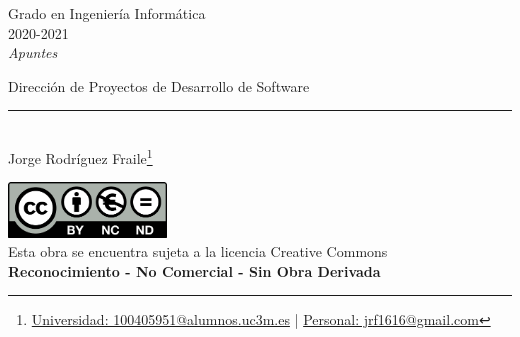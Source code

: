 \documentclass[12pt, twoside, openright]{report} %
\begin{document}
	
\begin{titlepage}
	\begin{sffamily}
	\color{azulUC3M}
	\begin{center}
		\begin{figure}[H] %
		\end{figure}
		\vspace{2.5cm}
		\begin{Large}
			Grado en Ingeniería Informática\\			
			2020-2021\\
			\vspace{2cm}		
			\textsl{Apuntes}\\
			\bigskip
		\end{Large}
		 	{\Huge Dirección de Proyectos de Desarrollo de Software}\\
		 	\vspace*{0.5cm}
	 		\rule{10.5cm}{0.1mm}\\
			\vspace*{0.9cm}
			{\LARGE Jorge Rodríguez Fraile\footnote{\href{mailto:100405951@alumnos.uc3m.es}{Universidad: 100405951@alumnos.uc3m.es}  |  \href{mailto:jrf1616@gmail.com}{Personal: jrf1616@gmail.com}}}\\ 
			\vspace*{1cm}
	\end{center}
	\vfill
	\color{black}
		\includegraphics[width=4.2cm]{img/creativecommons.png}\\
		Esta obra se encuentra sujeta a la licencia Creative Commons\\ \textbf{Reconocimiento - No Comercial - Sin Obra Derivada}
	\end{sffamily}
\end{titlepage}


\tableofcontents
\thispagestyle{fancy}
\end{document}
